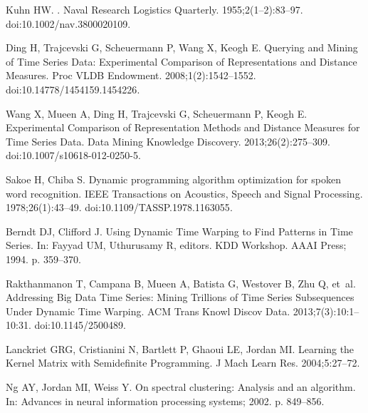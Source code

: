 \documentclass[10pt,letterpaper]{article}
\begin{document}
\begin{thebibliography}{10}
  Kuhn HW.
  .
  \newblock Naval Research Logistics Quarterly. 1955;2(1--2):83--97.
  \newblock doi:{10.1002/nav.3800020109}.

  Ding H, Trajcevski G, Scheuermann P, Wang X, Keogh E.
  \newblock Querying and Mining of Time Series Data: Experimental Comparison of
    Representations and Distance Measures.
  \newblock Proc VLDB Endowment. 2008;1(2):1542--1552.
  \newblock doi:{10.14778/1454159.1454226}.

  Wang X, Mueen A, Ding H, Trajcevski G, Scheuermann P, Keogh E.
  \newblock Experimental Comparison of Representation Methods and Distance
    Measures for Time Series Data.
  \newblock Data Mining Knowledge Discovery. 2013;26(2):275--309.
  \newblock doi:{10.1007/s10618-012-0250-5}.

  Sakoe H, Chiba S.
  \newblock Dynamic programming algorithm optimization for spoken word
    recognition.
  \newblock IEEE Transactions on Acoustics, Speech and Signal Processing.
    1978;26(1):43--49.
  \newblock doi:{10.1109/TASSP.1978.1163055}.

  Berndt DJ, Clifford J.
  \newblock Using Dynamic Time Warping to Find Patterns in Time Series.
  \newblock In: Fayyad UM, Uthurusamy R, editors. KDD Workshop. AAAI Press; 1994.
    p. 359--370.

  Rakthanmanon T, Campana B, Mueen A, Batista G, Westover B, Zhu Q, et~al.
  \newblock Addressing Big Data Time Series: Mining Trillions of Time Series
    Subsequences Under Dynamic Time Warping.
  \newblock ACM Trans Knowl Discov Data. 2013;7(3):10:1--10:31.
  \newblock doi:{10.1145/2500489}.

  Lanckriet GRG, Cristianini N, Bartlett P, Ghaoui LE, Jordan MI.
  \newblock Learning the Kernel Matrix with Semidefinite Programming.
  \newblock J Mach Learn Res. 2004;5:27--72.

  Ng AY, Jordan MI, Weiss Y.
  \newblock On spectral clustering: Analysis and an algorithm.
  \newblock In: Advances in neural information processing systems; 2002. p.
    849--856.

  \end{thebibliography}



\end{document}
